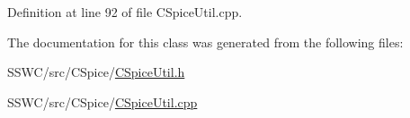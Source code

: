 Definition at line 92 of file C\+Spice\+Util.\+cpp.



The documentation for this class was generated from the following files\+:\begin{DoxyCompactItemize}
\item 
S\+S\+W\+C/src/\+C\+Spice/\hyperlink{_c_spice_util_8h}{C\+Spice\+Util.\+h}\item 
S\+S\+W\+C/src/\+C\+Spice/\hyperlink{_c_spice_util_8cpp}{C\+Spice\+Util.\+cpp}\end{DoxyCompactItemize}
